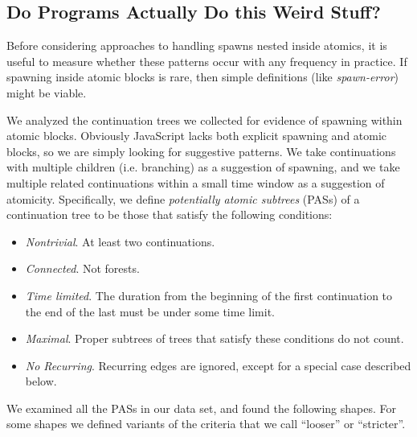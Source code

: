 \documentclass[acmsmall,anonymous,review]{acmart}\settopmatter{printfolios=true,printccs=false,printacmref=false}
\begin{document}

\subsection{Do Programs Actually Do this Weird Stuff?}

Before considering approaches to handling spawns nested inside atomics, it is useful to measure whether these patterns occur with any frequency in practice.
If spawning inside atomic blocks is rare, then simple definitions (like \emph{spawn-error}) might be viable.

We analyzed the continuation trees we collected for evidence of spawning within atomic blocks.
Obviously JavaScript lacks both explicit spawning and atomic blocks, so we are simply looking for suggestive patterns.
We take continuations with multiple children (i.e. branching) as a suggestion of spawning, and we take multiple related continuations within a small time window as a suggestion of atomicity.
Specifically, we define \emph{potentially atomic subtrees} (PASs) of a continuation tree to be those that satisfy the following conditions:

\begin{itemize}
\item \emph{Nontrivial}. At least two continuations.
\item \emph{Connected}. Not forests.
\item \emph{Time limited}. The duration from the beginning of the first continuation to the end of the last must be under some time limit.
\item \emph{Maximal}. Proper subtrees of trees that satisfy these conditions do not count.
\item \emph{No Recurring}. Recurring edges are ignored, except for a special case described below.
\end{itemize}

We examined all the PASs in our data set, and found the following shapes.
For some shapes we defined variants of the criteria that we call ``looser'' or ``stricter''.
\end{document}
